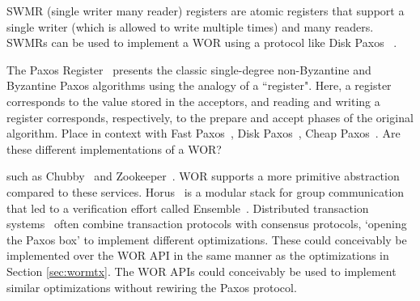 SWMR (single writer many reader) registers are atomic registers that support a single writer (which is allowed to write 
multiple times) and many readers. SWMRs can be used to implement a WOR using a protocol like Disk Paxos~
\cite{diskpaxos}.

The Paxos Register~\cite{li2007paxos} presents the classic single-degree non-Byzantine and Byzantine Paxos 
algorithms using the analogy of a ``register". Here, a register corresponds to the
value stored in the acceptors, and reading and writing a register corresponds,
respectively, to the prepare and accept phases of the original algorithm.
Place in context with Fast Paxos~\cite{fastpaxos}, Disk Paxos~\cite{diskpaxos}, Cheap Paxos~\cite{cheappaxos}. Are 
these different implementations of a WOR?

such as Chubby~\cite{chubby} and Zookeeper~\cite{zookeeper}.
 WOR supports a more primitive abstraction compared to these services.
Horus~\cite{horus} is a modular stack for group communication that led to a verification effort called Ensemble~\cite{ensemble}. 
Distributed transaction systems~\cite{janus, tapir} often 
combine transaction protocols with consensus protocols, 
`opening the Paxos box' to implement different optimizations. 
These could conceivably be implemented over the WOR API in the same manner as the optimizations 
in Section \ref{sec:wormtx}.
The WOR APIs could conceivably be used to implement similar optimizations without rewiring the Paxos protocol.